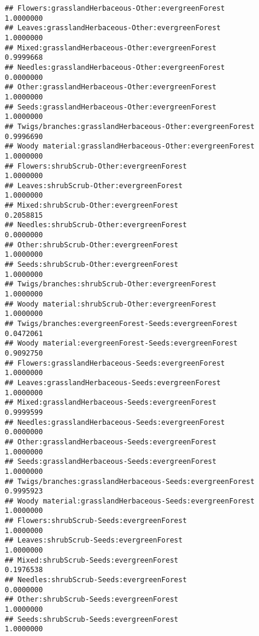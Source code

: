 \documentclass[
]{article}
\begin{document}
\begin{verbatim}
## Flowers:grasslandHerbaceous-Other:evergreenForest                     1.0000000
## Leaves:grasslandHerbaceous-Other:evergreenForest                      1.0000000
## Mixed:grasslandHerbaceous-Other:evergreenForest                       0.9999668
## Needles:grasslandHerbaceous-Other:evergreenForest                     0.0000000
## Other:grasslandHerbaceous-Other:evergreenForest                       1.0000000
## Seeds:grasslandHerbaceous-Other:evergreenForest                       1.0000000
## Twigs/branches:grasslandHerbaceous-Other:evergreenForest              0.9996690
## Woody material:grasslandHerbaceous-Other:evergreenForest              1.0000000
## Flowers:shrubScrub-Other:evergreenForest                              1.0000000
## Leaves:shrubScrub-Other:evergreenForest                               1.0000000
## Mixed:shrubScrub-Other:evergreenForest                                0.2058815
## Needles:shrubScrub-Other:evergreenForest                              0.0000000
## Other:shrubScrub-Other:evergreenForest                                1.0000000
## Seeds:shrubScrub-Other:evergreenForest                                1.0000000
## Twigs/branches:shrubScrub-Other:evergreenForest                       1.0000000
## Woody material:shrubScrub-Other:evergreenForest                       1.0000000
## Twigs/branches:evergreenForest-Seeds:evergreenForest                  0.0472061
## Woody material:evergreenForest-Seeds:evergreenForest                  0.9092750
## Flowers:grasslandHerbaceous-Seeds:evergreenForest                     1.0000000
## Leaves:grasslandHerbaceous-Seeds:evergreenForest                      1.0000000
## Mixed:grasslandHerbaceous-Seeds:evergreenForest                       0.9999599
## Needles:grasslandHerbaceous-Seeds:evergreenForest                     0.0000000
## Other:grasslandHerbaceous-Seeds:evergreenForest                       1.0000000
## Seeds:grasslandHerbaceous-Seeds:evergreenForest                       1.0000000
## Twigs/branches:grasslandHerbaceous-Seeds:evergreenForest              0.9995923
## Woody material:grasslandHerbaceous-Seeds:evergreenForest              1.0000000
## Flowers:shrubScrub-Seeds:evergreenForest                              1.0000000
## Leaves:shrubScrub-Seeds:evergreenForest                               1.0000000
## Mixed:shrubScrub-Seeds:evergreenForest                                0.1976538
## Needles:shrubScrub-Seeds:evergreenForest                              0.0000000
## Other:shrubScrub-Seeds:evergreenForest                                1.0000000
## Seeds:shrubScrub-Seeds:evergreenForest                                1.0000000

\end{verbatim}
\end{document}
